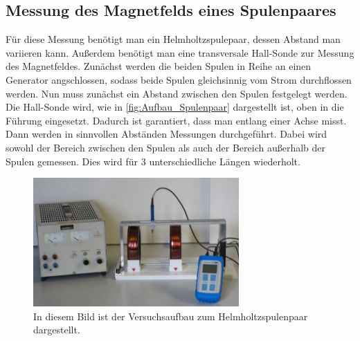 \subsection{Messung des Magnetfelds eines Spulenpaares}
\label{subsec:D_Spulenpaar}
Für diese Messung benötigt man ein Helmholtzspulepaar, dessen Abstand man variieren kann. Außerdem benötigt man eine transversale Hall-Sonde zur Messung des Magnetfeldes. Zunächst
werden die beiden Spulen in Reihe an einen Generator angschlossen, sodass beide Spulen gleichsinnig vom Strom durchflossen werden. Nun muss zunächst ein Abstand zwischen den Spulen 
festgelegt werden. Die Hall-Sonde wird, wie in \autoref{fig:Aufbau_Spulenpaar} dargestellt ist, oben in die Führung eingesetzt. Dadurch ist garantiert, dass man entlang einer Achse misst.
Dann werden in sinnvollen Abständen Messungen durchgeführt. Dabei wird sowohl der Bereich zwischen den Spulen als auch der Bereich außerhalb der Spulen gemessen. Dies wird für 3 unterschiedliche 
Längen wiederholt.
\begin{figure}
    \centering
    \caption{In diesem Bild ist der Versuchsaufbau zum Helmholtzspulenpaar dargestellt.\cite{v308}}
    \label{fig:Aufbau_Spulenpaar}
    \includegraphics[width=0.7\textwidth]{content/HelmHoltzAufbau.PNG}
\end{figure}
